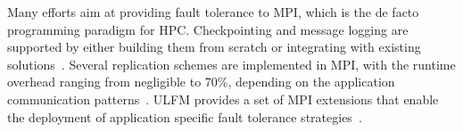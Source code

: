 

Many efforts aim at providing fault tolerance to MPI, which is the de facto programming paradigm for HPC. Checkpointing and message logging are supported by either building them from scratch or integrating with existing solutions~\cite{doi:10.1177/1094342005056139,bosilca2002mpich,7013060,4228333,Moody:10:SCR}. Several replication schemes are implemented in MPI, with the runtime overhead ranging from negligible to 70\%, depending on the application communication patterns~\cite{engelmann2011redundant,ferreira_sc_2011,fiala_2012_sdc}. ULFM provides a set of MPI extensions that enable the deployment of application specific fault tolerance strategies~\cite{Bland2012}.